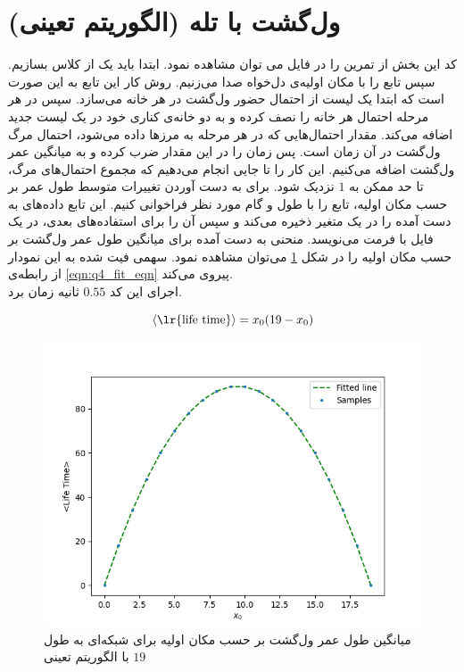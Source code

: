 \documentclass[11pt, a4paper]{article}
\begin{document}
\section{\textbf{ول‌گشت با تله (الگوریتم تعینی)}}
کد این بخش از تمرین را در فایل
می توان مشاهده نمود.
ابتدا باید یک
از کلاس
بسازیم.
سپس تابع
را با مکان اولیه‌ی دل‌خواه صدا می‌زنیم.
روش کار این تابع به این صورت است که ابتدا یک لیست از احتمال حضور ول‌گشت در هر خانه می‌سازد.
سپس در هر مرحله احتمال هر خانه را نصف کرده و به دو خانه‌ی کناری خود در یک لیست جدید اضافه می‌کند.
مقدار احتمال‌هایی که در هر مرحله به مرز‌ها داده می‌شود، احتمال مرگ ول‌گشت در آن زمان است.
پس زمان را در این مقدار ضرب کرده و به میانگین عمر ول‌گشت اضافه می‌کنیم.
این کار را تا جایی انجام می‌دهیم که مجموع احتمال‌های مرگ، تا حد ممکن به
$1$
نزدیک شود.
برای به دست آوردن تغییرات متوسط طول عمر بر حسب مکان اولیه،
تابع
را با طول و گام مورد نظر فراخوانی کنیم.
این تابع داده‌های به دست آمده را در یک متغیر ذخیره می‌کند و سپس آن را برای استفاده‌های بعدی،
در یک فایل با فرمت
می‌نویسد.
منحنی به دست آمده برای میانگین طول عمر ول‌گشت بر حسب مکان اولیه را در شکل‌
\ref{fig:q4_life_time}
می‌توان مشاهده نمود.
سهمی فیت شده به این نمودار از رابطه‌ی
\eqref{eqn:q4_fit_eqn}
پیروی می‌کند.
\\
اجرای این کد
$0.55$
ثانیه زمان برد.

\begin{equation}
  \braket{\text{\lr{life time}}} = x_0 (19 - x_0)
  \label{eqn:q4_fit_eqn}
\end{equation}

\begin{figure}[h]
  \centering
  \includegraphics[width=.7\textwidth]{q4_life_time_20_1_.png}
  \caption{میانگین طول عمر ول‌گشت بر حسب مکان اولیه برای شبکه‌ای به طول $19$ با الگوریتم تعینی}
  \label{fig:q4_life_time}
\end{figure}
\end{document}
